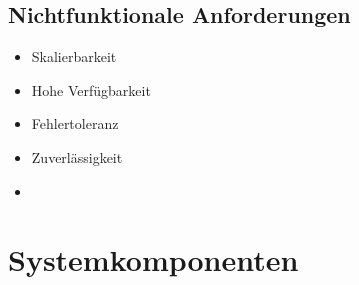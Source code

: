 \subsection{Nichtfunktionale Anforderungen}
\begin{itemize}
  \item Skalierbarkeit
  \item Hohe Verfügbarkeit
  \item Fehlertoleranz
  \item Zuverlässigkeit
\item
\end{itemize}
\section{Systemkomponenten}

